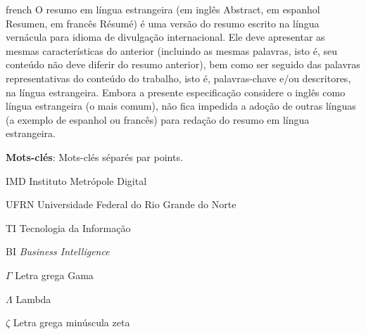 \documentclass[
    12pt,				%
	oneside,            %
	a4paper,			%
	english,			%
	french,
	spanish,
	brazil				%
	]{abntex2}
\newcommand{\listofquadrosname}{Lista de quadros}
\begin{document}
\begin{resumo}[Résumé]
\vspace{\onelineskip}
\begin{otherlanguage*}{french}
O resumo em língua estrangeira (em inglês Abstract, em espanhol Resumen, em francês Résumé) é uma versão do resumo escrito na língua vernácula para idioma de divulgação internacional. Ele deve apresentar as mesmas características do anterior (incluindo as mesmas palavras, isto é, seu conteúdo não deve diferir do resumo anterior), bem como ser seguido das palavras representativas do conteúdo do trabalho, isto é, palavras-chave e/ou descritores, na língua estrangeira. Embora a presente especificação considere o inglês como língua estrangeira (o mais comum), não fica impedida a adoção de outras línguas (a exemplo de espanhol ou francês) para redação do resumo em língua estrangeira.

\noindent\textbf{Mots-clés}: Mots-clés séparés par points.
\end{otherlanguage*}
\end{resumo}

\listoffigures*
\clearpage

\pdfbookmark[0]{\listofquadrosname}{loq}
\listofquadros*
\clearpage

\listoftables*
\clearpage

\begin{siglas}
  \item[IMD] Instituto Metrópole Digital
  \item[UFRN] Universidade Federal do Rio Grande do Norte
  \item[TI] Tecnologia da Informação
  \item[BI] \textit{Business Intelligence}
  
\end{siglas}

\begin{simbolos}
  \item[$\Gamma$] Letra grega Gama
  \item[$\Lambda$] Lambda
  \item[$\zeta$] Letra grega minúscula zeta
\end{simbolos}

\tableofcontents*
\clearpage


\textual



\postextual



\end{document}
